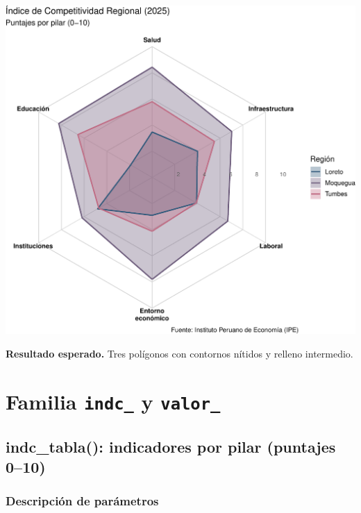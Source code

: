 \documentclass[
  11pt,
  letterpaper,
  DIV=11,
  numbers=noendperiod]{scrartcl}
\begin{document}
\includegraphics{Manual_files/figure-pdf/unnamed-chunk-56-1.pdf}

\textbf{Resultado esperado.} Tres polígonos con contornos nítidos y
relleno intermedio.

\section{\texorpdfstring{Familia \texttt{indc\_} y
\texttt{valor\_}}{Familia indc\_ y valor\_}}\label{familia-indc_-y-valor_}

\subsection{\texorpdfstring{\textbf{indc\_tabla(): indicadores por pilar
(puntajes
0--10)}}{indc\_tabla(): indicadores por pilar (puntajes 0--10)}}\label{indc_tabla-indicadores-por-pilar-puntajes-010}

\subsubsection{\texorpdfstring{\textbf{Descripción de
parámetros}}{Descripción de parámetros}}\label{descripciuxf3n-de-paruxe1metros}
\end{document}
